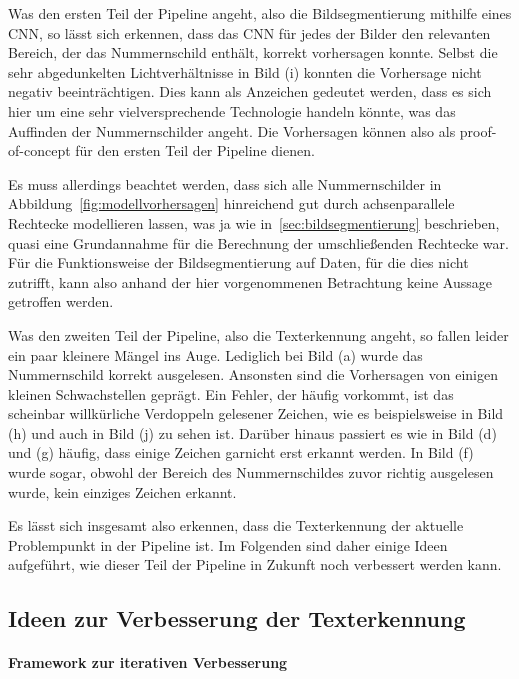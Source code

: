 Was den ersten Teil der Pipeline angeht, also die Bildsegmentierung
mithilfe eines CNN, so l\"asst sich erkennen, dass das CNN f\"ur jedes
der Bilder den relevanten Bereich, der das Nummernschild enth\"alt,
korrekt vorhersagen konnte.
Selbst die sehr abgedunkelten Lichtverh\"altnisse in Bild (i) konnten
die Vorhersage nicht negativ beeintr\"achtigen.
Dies kann als Anzeichen gedeutet werden, dass es sich hier um eine
sehr vielversprechende Technologie handeln k\"onnte, was das Auffinden
der Nummernschilder angeht.
Die Vorhersagen k\"onnen also als proof-of-concept f\"ur den ersten
Teil der Pipeline dienen.

Es muss allerdings beachtet werden, dass sich alle Nummernschilder in
Abbildung~\ref{fig:modellvorhersagen} hinreichend gut durch
achsenparallele Rechtecke modellieren lassen, was ja wie
in~\ref{sec:bildsegmentierung} beschrieben, quasi eine Grundannahme f\"ur
die Berechnung der umschlie{\ss}enden Rechtecke war.
F\"ur die Funktionsweise der Bildsegmentierung auf Daten, f\"ur die dies
nicht zutrifft, kann also anhand der hier vorgenommenen Betrachtung
keine Aussage getroffen werden.

Was den zweiten Teil der Pipeline, also die Texterkennung angeht, so
fallen leider ein paar kleinere M\"angel ins Auge.
Lediglich bei Bild (a) wurde das Nummernschild
korrekt ausgelesen. Ansonsten sind die Vorhersagen von einigen kleinen
Schwachstellen gepr\"agt.
Ein Fehler, der h\"aufig vorkommt, ist das scheinbar
willk\"urliche Verdoppeln gelesener Zeichen, wie es beispielsweise
in Bild (h) und auch in Bild (j) zu sehen ist.
Dar\"uber hinaus passiert es wie in Bild (d) und (g) h\"aufig, dass
einige Zeichen garnicht erst erkannt werden.
In Bild (f) wurde sogar, obwohl der Bereich des Nummernschildes zuvor
richtig ausgelesen wurde, kein einziges Zeichen erkannt.

Es l\"asst sich insgesamt also erkennen, dass die Texterkennung
der aktuelle Problempunkt in der Pipeline ist.
Im Folgenden sind daher einige Ideen aufgef\"uhrt, wie dieser Teil
der Pipeline in Zukunft noch verbessert werden kann.

\subsection{Ideen zur Verbesserung der Texterkennung}
\label{sec:verbesserungen}

\paragraph{Framework zur iterativen Verbesserung}

